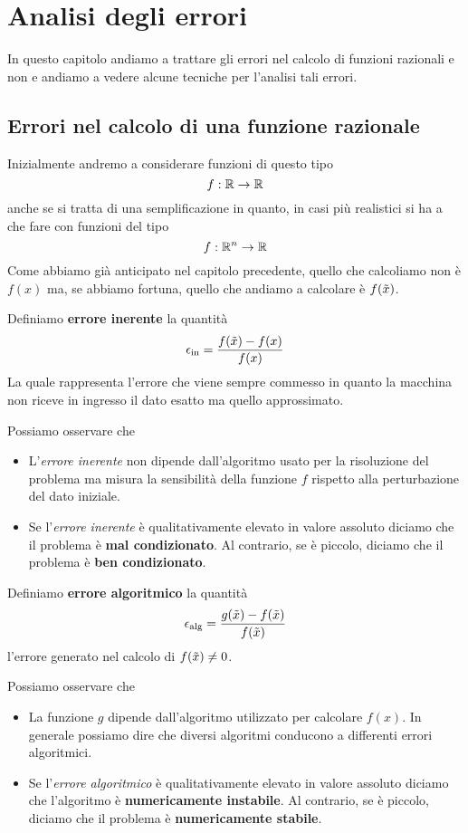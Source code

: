 \chapter{Analisi degli errori}
In questo capitolo andiamo a trattare gli errori nel calcolo di funzioni razionali e non e andiamo a vedere
alcune tecniche per l'analisi tali errori.

\section{Errori nel calcolo di una funzione razionale}
Inizialmente andremo a considerare funzioni di questo tipo
\[ f : \mathbb{R} \to \mathbb{R}\]
anche se si tratta di una semplificazione in quanto, in casi più realistici si ha a che fare con funzioni del tipo
\[ f : \mathbb{R}^n \to \mathbb{R} \]
Come abbiamo già anticipato nel capitolo precedente, quello che calcoliamo non è $f(x)$ ma, se abbiamo fortuna,
quello che andiamo a calcolare è $f(\tilde{x})$.

\begin{definition}
	Definiamo \textbf{errore inerente} la quantità
	\[ \epsilon_{\text{in}} = \frac{f(\tilde{x}) - f(x)}{f(x)} \]
	La quale rappresenta l'errore che viene sempre commesso in quanto la macchina non riceve in ingresso
	il dato esatto ma quello approssimato.
\end{definition}

\begin{observation}
	Possiamo osservare che
	\begin{itemize}
		\item L'\emph{errore inerente} non dipende dall'algoritmo usato per la risoluzione del problema ma
		      misura la sensibilità della funzione $f$ rispetto alla perturbazione del dato iniziale.
		\item Se l'\emph{errore inerente} è qualitativamente elevato in valore assoluto diciamo che il problema
		      è \textbf{mal condizionato}. Al contrario, se è piccolo, diciamo che il problema è
		      \textbf{ben condizionato}.
	\end{itemize}
\end{observation}

\begin{definition}
	Definiamo \textbf{errore algoritmico} la quantità
	\[ \epsilon_{\text{alg}} = \frac{g(\tilde{x}) - f(\tilde{x})}{f(\tilde{x})} \]
	l'errore generato nel calcolo di $f(\tilde{x}) \neq 0$.
\end{definition}

\begin{observation}
	Possiamo osservare che
	\begin{itemize}
		\item La funzione $g$ dipende dall'algoritmo utilizzato per calcolare $f(x)$. In generale possiamo dire
		      che diversi algoritmi conducono a differenti errori algoritmici.
		\item Se l'\emph{errore algoritmico} è qualitativamente elevato in valore assoluto diciamo che l'algoritmo
		      è \textbf{numericamente instabile}. Al contrario, se è piccolo, diciamo che il problema è
		      \textbf{numericamente stabile}.
	\end{itemize}
\end{observation}

